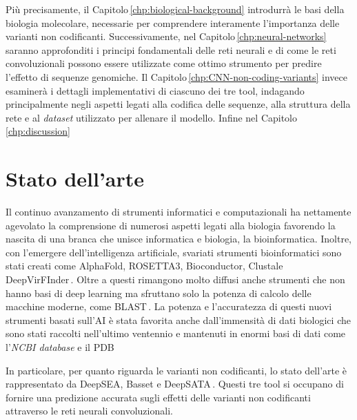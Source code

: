 Più precisamente, il Capitolo\,\ref{chp:biological-background} introdurrà le basi della biologia molecolare, necessarie per comprendere interamente l'importanza delle varianti non codificanti. Successivamente, nel Capitolo\,\ref{chp:neural-networks} saranno approfonditi i principi fondamentali delle reti neurali e di come le reti convoluzionali possono essere utilizzate come ottimo strumento per predire l'effetto di sequenze genomiche. Il Capitolo\,\ref{chp:CNN-non-coding-variants} invece esaminerà i dettagli implementativi di ciascuno dei tre tool, indagando principalmente negli aspetti legati alla codifica delle sequenze, alla struttura della rete e al \textsl{dataset} utilizzato per allenare il modello. Infine nel Capitolo\,\ref{chp:discussion} 


% 

\section{Stato dell'arte}

Il continuo avanzamento di strumenti informatici e computazionali ha nettamente agevolato la comprensione di numerosi aspetti legati alla biologia favorendo la nascita di una branca che unisce informatica e biologia, la bioinformatica. Inoltre, con l'emergere dell'intelligenza artificiale, svariati strumenti bioinformatici sono stati creati come AlphaFold, ROSETTA3, Bioconductor, Clustale  DeepVirFInder\,\cite{jumper2021highly, leaver2011rosetta3, gentleman2004bioconductor, larkin2007clustal, ren2020identifying}. Oltre a questi rimangono molto diffusi anche strumenti che non hanno basi di deep learning ma sfruttano solo la potenza di calcolo delle macchine moderne, come BLAST\,\cite{altschul1990basic}. La potenza e l'accuratezza di questi nuovi strumenti basati sull'AI è stata favorita anche dall'immensità di dati biologici che sono stati raccolti nell'ultimo ventennio e mantenuti in enormi basi di dati come l'\textit{NCBI database} e il PDB\,\cite{sherry2001dbsnp, burley2017protein}

In particolare, per quanto riguarda le varianti non codificanti, lo stato dell'arte è rappresentato da DeepSEA, Basset e DeepSATA\,\cite{zhou2015predicting, kelley2016basset, ma2023deepsata}. Questi tre tool si occupano di fornire una predizione accurata sugli effetti delle varianti non codificanti attraverso le reti neurali convoluzionali.

